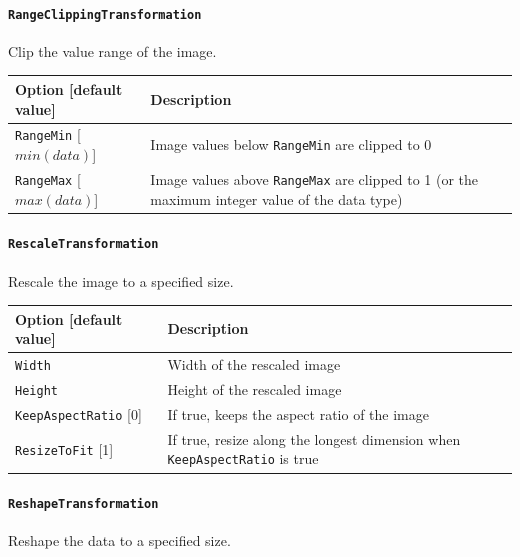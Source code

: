 \documentclass[a4paper,11pt,oneside]{article}
\newcommand{\iponly}{\reversemarginpar
    \marginnote{\color{listletiblue}\normalfont\scriptsize
    {\ttfamily{}\hyperref[sec:N2D2-IP]{\color{listletiblue}N2D2 IP}} \emph{only}}}
\begin{document}
\paragraph{\texorpdfstring{\lstinline[basicstyle=\ttfamily\bfseries]!RangeClippingTransformation!\protect\iponly}
{RangeClippingTransformation}}
Clip the value range of the image.

\begin{center}
 \begin{tabular}{| p{5cm} | p{10cm} | }
 \hline
 Option [default value] & Description\\
 \hline\hline
  \lstinline!RangeMin! [$min(data)$] & Image values below \lstinline!RangeMin!
  are clipped to 0 \\
  \lstinline!RangeMax! [$max(data)$] & Image values above \lstinline!RangeMax!
   are clipped to 1 (or the maximum integer value of the data type) \\
 \hline
\end{tabular}
\end{center}

\paragraph{\texorpdfstring{%
\lstinline[basicstyle=\ttfamily\bfseries]!RescaleTransformation!}
{RescaleTransformation}}
Rescale the image to a specified size.

\begin{center}
 \begin{tabular}{| p{5cm} | p{10cm} | }
 \hline
 Option [default value] & Description\\
 \hline\hline
  \cellcolor{requiredcolor}\lstinline!Width! & Width of the rescaled image \\
  \cellcolor{requiredcolor}\lstinline!Height! & Height of the rescaled image \\
  \lstinline!KeepAspectRatio! [0] & If true, keeps the aspect ratio of the
  image \\
  \lstinline!ResizeToFit! [1] & If true, resize along the longest dimension
  when \lstinline!KeepAspectRatio! is true \\
 \hline
\end{tabular}
\end{center}

\paragraph{\texorpdfstring{%
\lstinline[basicstyle=\ttfamily\bfseries]!ReshapeTransformation!}
{ReshapeTransformation}}
Reshape the data to a specified size.
\end{document}
